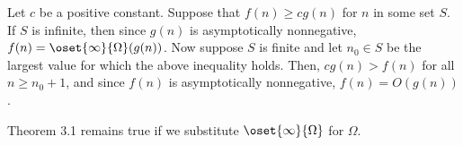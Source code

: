 Let $c$ be a positive constant.
Suppose that $f(n)\ge cg(n)$ for $n$ in some set $S$.
If $S$ is infinite, then since $g(n)$ is asymptotically nonnegative, $f(n)=\oset{\infty}{\Omega}(g(n))$.
Now suppose $S$ is finite and let $n_0\in S$ be the largest value for which the above inequality holds.
Then, $cg(n)>f(n)$ for all $n\ge n_0+1$, and since $f(n)$ is asymptotically nonnegative, $f(n)=O(g(n))$.

Theorem 3.1 remains true if we substitute $\oset{\infty}{\Omega}$ for $\Omega$.
